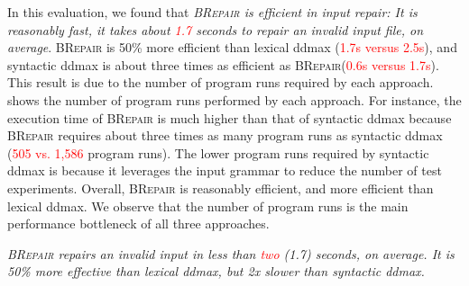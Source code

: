 \documentclass[sigconf,review,anonymous]{acmart}
\newenvironment{result}{\begin{framed}\centering\it}{\end{framed}}
\newcommand{\recheck}[1]{\textcolor{red}{#1}}
\newcommand{\approach}{\textsc{BRepair}\xspace}
\begin{document}
In this evaluation, we found that \textit{\approach is efficient in input repair: It is reasonably fast, it takes about \recheck{1.7} seconds to repair an invalid input file, on average}.
\approach is 50\% more efficient than lexical ddmax (\recheck{1.7s versus 2.5s}), and syntactic ddmax is about three times as efficient as \approach (\recheck{0.6s versus 1.7s}).
This result is %
due to the %
number of program runs required by each approach.
shows %
the number of %
program runs performed by each approach. %
For instance, the execution time
of \approach %
is much higher %
than that of syntactic ddmax
because \approach requires about three times as many program runs as syntactic ddmax (\recheck{505 vs. 1,586} program runs).
The lower program runs required by syntactic ddmax is because %
it leverages the input grammar to reduce the number of test experiments.
Overall, %
\approach is reasonably efficient, and %
more efficient than lexical ddmax. %
We observe that the number of program runs is the main performance bottleneck of all three approaches. %

\begin{result}
\approach %
repairs an invalid input in less than \recheck{two} (1.7) seconds, on average. %
It is 50\% more effective than lexical ddmax, but 2x slower than syntactic ddmax.
\end{result}
\end{document}
